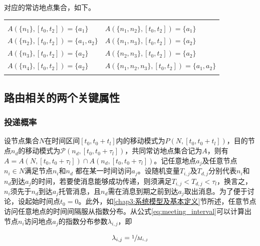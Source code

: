 对应的常访地点集合，如下。

\begin{tabular}{ll}
 & \\
$A(\{n_1\},[t_0,t_2])=\{a_1\}$ & $A(\{n_1,n_2\},[t_0,t_2])=\{a_1\}$ \\
$A(\{n_2\},[t_0,t_2])=\{a_1,a_2\}$ & $A(\{n_1,n_3\},[t_0,t_2])=\{a_2\}$ \\
$A(\{n_3\},[t_0,t_2])=\{a_2\}$ & $A(\{n_2,n_3\},[t_0,t_2])=\{a_2\}$ \\
$A(\{n_4\},[t_0,t_2])=\{a_2\}$ & $A(\{n_1,n_2,n_3\},[t_0,t_2])=\{a_1,a_2\}$ \\
 &
\end{tabular}

\subsection{路由相关的两个关键属性}
\label{chap3:路由相关的两个关键属性}

\subsubsection{投递概率}

设节点集合$N$在时间区间$[t_0,t_0+t_l]$内的移动模式为$P(N,[t_0,t_0+t_l])$，目的节点$n_d$的移动模式为$\mathcal{P}(n_d,[t_0,t_0+\tau_l])$，共同常访地点集合记为$A$，则有$A=A(N,[t_0,t_0+\tau_l])\cap A(n_d,[t_0,t_0+\tau_l])$。记任意地点$a_j$及任意节点$n_i\in N$满足节点$n_i$和$n_d$
都在某一时间访问$a_j$。设随机变量$T_{i,j}$及$T_{d,j}$分别代表$n_i$和$n_d$到达$a_j$的时间，若要使消息能够成功传递，则须满足$T_{i,j}<T_{d,j}<\tau_l$，换言之，$n_i$须先于$n_d$到达$a_j$托管消息，且$n_d$需在消息到期之前到达$a_j$取出消息。为了便于讨论，设起始时间点$t_0=0$。此外，如\ref{chap3:系统模型及基本定义}节所述，任意节点访问任意地点的时间间隔服从指数分布。从公式\ref{eq:meeting_interval}可以计算出节点$n_i$访问地点$a_j$的指数分布参数$\lambda_{i,j}$，即

\[
\lambda_{i,j} = \sfrac{1}{M_{i,j}}
\]

